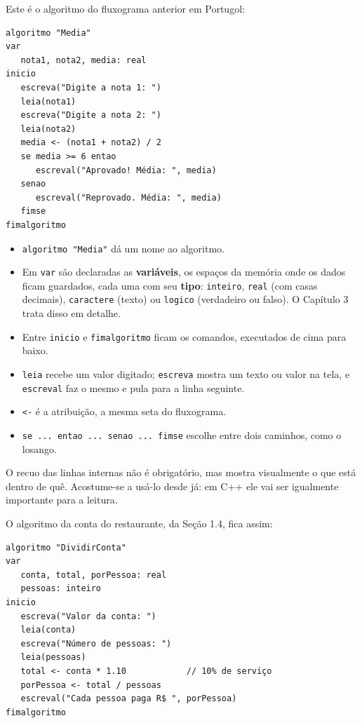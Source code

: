 Este é o algoritmo do fluxograma anterior em Portugol:

\begin{codigo}
\begin{Verbatim}[breaklines=true, breaksymbolleft={}, fontsize=\footnotesize]
algoritmo "Media"
var
   nota1, nota2, media: real
inicio
   escreva("Digite a nota 1: ")
   leia(nota1)
   escreva("Digite a nota 2: ")
   leia(nota2)
   media <- (nota1 + nota2) / 2
   se media >= 6 entao
      escreval("Aprovado! Média: ", media)
   senao
      escreval("Reprovado. Média: ", media)
   fimse
fimalgoritmo
\end{Verbatim}
\end{codigo}

\begin{itemize}
  \item \texttt{algoritmo "Media"} dá um nome ao algoritmo.
  \item Em \texttt{var} são declaradas as \textbf{variáveis}, os espaços da memória onde os dados ficam guardados, cada uma com seu \textbf{tipo}: \texttt{inteiro}, \texttt{real} (com casas decimais), \texttt{caractere} (texto) ou \texttt{logico} (verdadeiro ou falso). O Capítulo 3 trata disso em detalhe.
  \item Entre \texttt{inicio} e \texttt{fimalgoritmo} ficam os comandos, executados de cima para baixo.
  \item \texttt{leia} recebe um valor digitado; \texttt{escreva} mostra um texto ou valor na tela, e \texttt{escreval} faz o mesmo e pula para a linha seguinte.
  \item \texttt{<-} é a atribuição, a mesma seta do fluxograma.
  \item \texttt{se ... entao ... senao ... fimse} escolhe entre dois caminhos, como o losango.
\end{itemize}

O recuo das linhas internas não é obrigatório, mas mostra visualmente o que está dentro de quê. Acostume-se a usá-lo desde já: em C++ ele vai ser igualmente importante para a leitura.

O algoritmo da conta do restaurante, da Seção 1.4, fica assim:

\begin{codigo}
\begin{Verbatim}[breaklines=true, breaksymbolleft={}, fontsize=\footnotesize]
algoritmo "DividirConta"
var
   conta, total, porPessoa: real
   pessoas: inteiro
inicio
   escreva("Valor da conta: ")
   leia(conta)
   escreva("Número de pessoas: ")
   leia(pessoas)
   total <- conta * 1.10            // 10% de serviço
   porPessoa <- total / pessoas
   escreval("Cada pessoa paga R$ ", porPessoa)
fimalgoritmo
\end{Verbatim}
\end{codigo}

